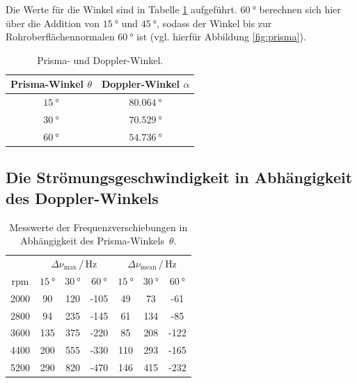 Die Werte für die Winkel sind in Tabelle \ref{tab:Winkel} aufgeführt. $\SI{60}{\degree}$ berechnen sich hier über die Addition 
von $\SI{15}{\degree}$ und $\SI{45}{\degree}$, sodass der Winkel bis zur Rohroberflächennormalen $\SI{60}{\degree}$ ist (vgl. hierfür Abbildung \ref{fig:prisma}). 
\begin{table}
    \centering
    \caption{Prisma- und Doppler-Winkel.}
    \label{tab:Winkel}
    \begin{tabular}{c c}
        \toprule
        Prisma-Winkel $\theta$ & Doppler-Winkel $\alpha$ \\
        \midrule
        $\SI{15}{\degree}$ & $\SI{80.064}{\degree}$ \\        
        $\SI{30}{\degree}$ & $\SI{70.529}{\degree}$ \\
        $\SI{60}{\degree}$ & $\SI{54.736}{\degree}$ \\        
        \bottomrule
    \end{tabular}
\end{table}

\subsection{Die Strömungsgeschwindigkeit in Abhängigkeit des Doppler-Winkels}

\begin{table}
    \centering
    \caption{Messwerte der Frequenzverschiebungen in Abhängigkeit des Prisma-Winkels~$\theta$.}
    \label{tab:1Mess}
    \begin{tabular}{c c c c c c c}
        \toprule
            & \multicolumn{3}{c}{$\Delta \nu_\text{max}\,/\,\si{\hertz}$} & \multicolumn{3}{c}{$\Delta \nu_\text{mean}\,/\,\si{\hertz}$} \\
        \cmidrule(lr){2-4} \cmidrule(lr){5-7}
        rpm & $\SI{15}{\degree}$ & $\SI{30}{\degree}$ & $\SI{60}{\degree}$ & $\SI{15}{\degree}$ & $\SI{30}{\degree}$ & $\SI{60}{\degree}$ \\
        \midrule
        2000 &  90 & 120 & -105 &  49 &  73 & -61  \\
        2800 &  94 & 235 & -145 &  61 & 134 & -85  \\
        3600 & 135 & 375 & -220 &  85 & 208 & -122 \\
        4400 & 200 & 555 & -330 & 110 & 293 & -165 \\
        5200 & 290 & 820 & -470 & 146 & 415 & -232 \\
        \bottomrule
    \end{tabular}
\end{table}

